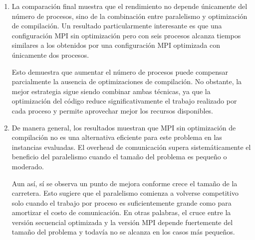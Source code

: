 \begin{enumerate}
Sin embargo, aun con estas mejoras, la versión paralela continúa siendo considerablemente más lenta que la secuencial optimizada. Para cargas pequeñas, la diferencia sigue siendo superior a un orden de magnitud. Además, se observa una alta variabilidad en las mediciones para configuraciones ligeras, alcanzando coeficientes de variación cercanos al 39\%. Este comportamiento es consistente con la naturaleza compartida de la infraestructura en la nube y con la sensibilidad de las aplicaciones de baja carga a fluctuaciones de latencia en la red.

En tamaños grandes la situación mejora progresivamente. Por ejemplo, con $N=10$ millones de celdas y seis procesos, el tiempo se reduce hasta aproximadamente 4.6 segundos. Aunque esta cifra sigue siendo superior a la obtenida por la versión secuencial optimizada, la tendencia evidencia que el paralelismo comienza a resultar beneficioso cuando el volumen de trabajo crece suficientemente.

\item

La comparación final muestra que el rendimiento no depende únicamente del número de procesos, sino de la combinación entre paralelismo y optimización de compilación. Un resultado particularmente interesante es que una configuración MPI sin optimización pero con seis procesos alcanza tiempos similares a los obtenidos por una configuración MPI optimizada con únicamente dos procesos.

Esto demuestra que aumentar el número de procesos puede compensar parcialmente la ausencia de optimizaciones de compilación. No obstante, la mejor estrategia sigue siendo combinar ambas técnicas, ya que la optimización del código reduce significativamente el trabajo realizado por cada proceso y permite aprovechar mejor los recursos disponibles.

\item

De manera general, los resultados muestran que MPI sin optimización de compilación no es una alternativa eficiente para este problema en las instancias evaluadas. El overhead de comunicación supera sistemáticamente el beneficio del paralelismo cuando el tamaño del problema es pequeño o moderado.

Aun así, sí se observa un punto de mejora conforme crece el tamaño de la carretera. Esto sugiere que el paralelismo comienza a volverse competitivo solo cuando el trabajo por proceso es suficientemente grande como para amortizar el costo de comunicación. En otras palabras, el cruce entre la versión secuencial optimizada y la versión MPI depende fuertemente del tamaño del problema y todavía no se alcanza en los casos más pequeños.


\end{enumerate}

